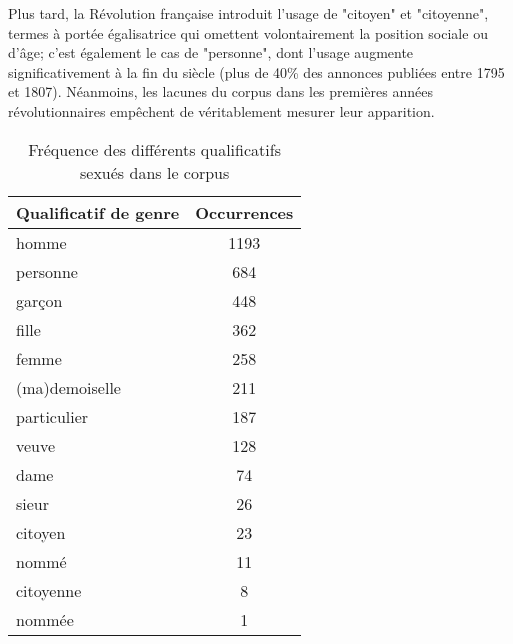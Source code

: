 Plus tard, la Révolution française introduit l'usage de "citoyen" et "citoyenne", termes à portée égalisatrice qui omettent volontairement la position sociale ou d'âge; c'est également le cas de "personne", dont l'usage augmente significativement à la fin du siècle (plus de 40\% des annonces publiées entre 1795 et 1807). Néanmoins, les lacunes du corpus dans les premières années révolutionnaires empêchent de véritablement mesurer leur apparition. 


\begin{table}[ht]
	\centering
		\begin{tabular}{lc}
			\hline
			\multicolumn{1}{c}{\textbf{Qualificatif de genre}} & \textbf{Occurrences} \\ \hline
			homme                                                & 1193            \\ 
			personne                                             & 684             \\ 
			garçon                                               & 448             \\ 
			fille                                                & 362             \\ 
			femme                                                & 258             \\ 
			(ma)demoiselle                                       & 211             \\ 
			particulier                                          & 187             \\ 
			veuve                                                & 128             \\ 
			dame                                                 & 74              \\ 
			sieur                                                & 26              \\ 
			citoyen                                              & 23              \\ 
			nommé                                                & 11              \\ 
			citoyenne                                            & 8               \\ 
			nommée                                               & 1               \\ \hline
		\end{tabular}
		\caption{Fréquence des différents qualificatifs sexués dans le corpus}
\end{table}


